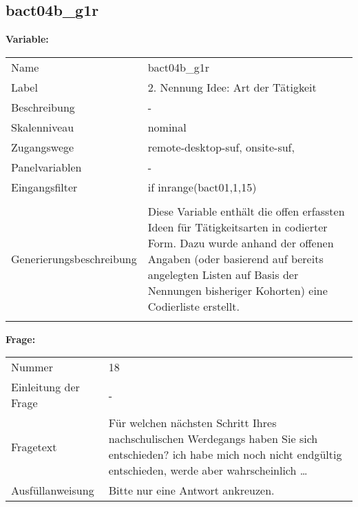 	
	
	\subsection{bact04b\_g1r}
	\label{subSection:bact04b_g1r}

	\noindent\textbf{Variable:}\\
		\begin{tabular}{lL{11.3cm}}
			\label{tableVariable:bact04b_g1r}
			Name & bact04b\_g1r \\
			Label & 2. Nennung Idee: Art der Tätigkeit \\
			Beschreibung & - \\
			Skalenniveau & nominal \\
			Zugangswege &
				remote-desktop-suf,
				onsite-suf,
 \\
			Panelvariablen & -
			 \\
			Eingangsfilter & if inrange(bact01,1,15) \\
 \\
					Generierungsbeschreibung & Diese Variable enthält die offen erfassten Ideen für Tätigkeitsarten in codierter Form. Dazu wurde anhand der offenen Angaben (oder basierend auf bereits angelegten Listen auf Basis der Nennungen bisheriger Kohorten) eine Codierliste erstellt.
				 \\	
			 \\
		\end{tabular}

		\vspace*{1 cm}
		\noindent\textbf{Frage:}\\
		\begin{tabular}{lL{11.3cm}}
			\label{tableQuestion:bact04b_g1r}
			Nummer & 18 \\
			Einleitung der Frage & - \\
			Fragetext & Für welchen nächsten Schritt Ihres nachschulischen Werdegangs haben Sie sich entschieden?
ich habe mich noch nicht endgültig entschieden, werde aber wahrscheinlich … \\
			Ausfüllanweisung & Bitte nur eine Antwort ankreuzen. \\
		\end{tabular}





